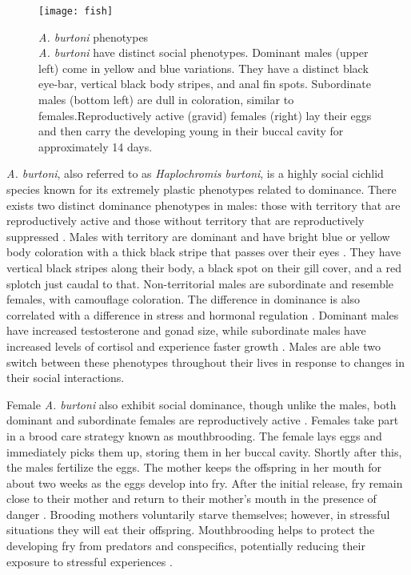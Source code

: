 \documentclass[12pt,twoside]{reedthesis}
\begin{document}
\begin{figure}[htbp] 
\begin{centering} 
\texttt{[image: fish]}
\caption[\textit{A. burtoni} phenotypes]{\footnotesize{\textit{A. burtoni} phenotypes
     \citep{fernald_social_2012} \\ \textit{A. burtoni} have distinct social
     phenotypes. Dominant males (upper left) come in yellow and blue variations.
   They have a distinct black eye-bar, vertical black body stripes, and anal fin
   spots. Subordinate males (bottom left) are dull in coloration, similar to
   females.Reproductively active (gravid) females (right) lay their eggs and
   then carry the developing young in their buccal cavity for approximately 14 days.}}
\label{subd}
\end{centering} 
\end{figure}

 \textit{A. burtoni}, also referred to as \textit{Haplochromis burtoni}, is a
 highly social cichlid species known for its extremely plastic phenotypes related to
 dominance. There exists two distinct dominance phenotypes in males:
those with territory that are reproductively active and those without territory
that are reproductively suppressed \citep{fernald_quantitative_1977}. Males with
territory are dominant and have bright blue or yellow body coloration with a thick black
stripe that passes over their eyes \citep{border_color_2019}. They have vertical black stripes along their
body, a black spot on their gill cover, and a red splotch just caudal to that.
Non-territorial males are subordinate and resemble females, with camouflage coloration.
The difference in dominance is also correlated with a difference in stress and
hormonal regulation \citep{renn_fish_2008}. Dominant males have increased testosterone and gonad
size, while subordinate males have increased levels of
cortisol and experience faster growth \citep{francis_social_1993, renn_fish_2008}. Males are
able two switch between these phenotypes throughout their lives in response to
changes in their social interactions.

Female \textit{A. burtoni} also exhibit social dominance, though unlike the
males, both dominant and subordinate females are reproductively active \citep{renn_females_2012}. Females take part in a brood care strategy known as mouthbrooding. The female lays eggs and immediately picks them up, storing them in
her buccal cavity. Shortly after this, the males fertilize the eggs. The
mother keeps the offspring in her mouth for about two weeks as the eggs
develop into fry. After the initial release, fry remain close to their mother
and return to their mother's mouth in the presence of danger \citep{renn_maternal_2009}. Brooding
mothers voluntarily starve themselves; however, in stressful situations they
will eat their offspring. Mouthbrooding helps to protect the developing fry from
predators and conspecifics, potentially reducing their exposure to stressful
experiences \citep{renn_maternal_2009}.
\end{document}
